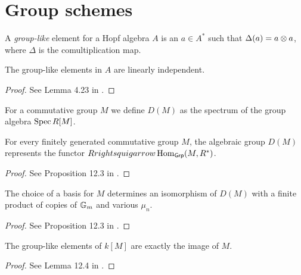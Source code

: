 \section{Group schemes}

\begin{definition}
  \label{grp_like}
  A \emph{group-like} element for a Hopf algebra $A$ is
  an $a\in A^*$ such that $\Delta(a) = a \otimes a$, where $\Delta$ is the comultiplication map.
\end{definition}

\begin{lemma}
  \label{grp_like_li}
  The group-like elements in $A$ are linearly independent.
\end{lemma}
\begin{proof}
  See Lemma 4.23 in \cite{Milne_2017}.
\end{proof}

\begin{definition}
  \label{grp_alg_sch}
  For a commutative group $M$ we define $D(M)$ as the spectrum of the group algebra $\operatorname{Spec} R[M]$.
\end{definition}

\begin{proposition}
  \label{DM_func}
  For every finitely generated commutative group $M$, the algebraic group $D(M)$
  represents the functor $R rightsquigarrow \operatorname{Hom}_{\mathsf{Grp}}(M,R^*)$.
\end{proposition}
\begin{proof}
  See Proposition 12.3 in \cite{Milne_2017}.
\end{proof}

\begin{proposition}
  \label{DM_struct}
  The choice of a basis for $M$ determines an isomorphism of $D(M)$
  with a finite product of copies of ${\mathbb G_m}$ and various $\mu_n$.
\end{proposition}
\begin{proof}
  See Proposition 12.3 in \cite{Milne_2017}.
\end{proof}

\begin{lemma}
  \label{grp_like_in_kM}
  The group-like elements of $k[M]$ are exactly the image of $M$.
\end{lemma}
\begin{proof}
  See Lemma 12.4 in \cite{Milne}.
\end{proof}

